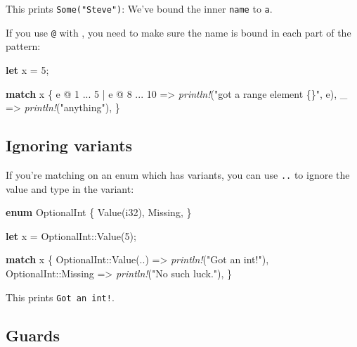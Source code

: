 \documentclass[a4paper,]{book}
\newenvironment{Shaded}{\begin{snugshade}}{\end{snugshade}}
\newcommand{\KeywordTok}[1]{\textcolor[rgb]{0.13,0.29,0.53}{\textbf{{#1}}}}
\newcommand{\DataTypeTok}[1]{\textcolor[rgb]{0.13,0.29,0.53}{{#1}}}
\newcommand{\DecValTok}[1]{\textcolor[rgb]{0.00,0.00,0.81}{{#1}}}
\newcommand{\StringTok}[1]{\textcolor[rgb]{0.31,0.60,0.02}{{#1}}}
\newcommand{\PreprocessorTok}[1]{\textcolor[rgb]{0.56,0.35,0.01}{\textit{{#1}}}}
\newcommand{\NormalTok}[1]{{#1}}
\begin{document}
This prints \texttt{Some("Steve")}: We've bound the inner \texttt{name}
to \texttt{a}.

If you use \texttt{@} with \texttt{\textbar{}}, you need to make sure
the name is bound in each part of the pattern:

\begin{Shaded}
\begin{Highlighting}[]
\KeywordTok{let} \NormalTok{x = }\DecValTok{5}\NormalTok{;}

\KeywordTok{match} \NormalTok{x \{}
    \NormalTok{e @ }\DecValTok{1} \NormalTok{... }\DecValTok{5} \NormalTok{| e @ }\DecValTok{8} \NormalTok{... }\DecValTok{10} \NormalTok{=> }\PreprocessorTok{println!}\NormalTok{(}\StringTok{"got a range element \{\}"}\NormalTok{, e),}
    \NormalTok{_ => }\PreprocessorTok{println!}\NormalTok{(}\StringTok{"anything"}\NormalTok{),}
\NormalTok{\}}
\end{Highlighting}
\end{Shaded}

\subsection{Ignoring variants}\label{ignoring-variants}

If you're matching on an enum which has variants, you can use
\texttt{..} to ignore the value and type in the variant:

\begin{Shaded}
\begin{Highlighting}[]
\KeywordTok{enum} \NormalTok{OptionalInt \{}
    \NormalTok{Value(}\DataTypeTok{i32}\NormalTok{),}
    \NormalTok{Missing,}
\NormalTok{\}}

\KeywordTok{let} \NormalTok{x = OptionalInt::Value(}\DecValTok{5}\NormalTok{);}

\KeywordTok{match} \NormalTok{x \{}
    \NormalTok{OptionalInt::Value(..) => }\PreprocessorTok{println!}\NormalTok{(}\StringTok{"Got an int!"}\NormalTok{),}
    \NormalTok{OptionalInt::Missing => }\PreprocessorTok{println!}\NormalTok{(}\StringTok{"No such luck."}\NormalTok{),}
\NormalTok{\}}
\end{Highlighting}
\end{Shaded}

This prints \texttt{Got\ an\ int!}.

\subsection{Guards}\label{guards}
\end{document}
